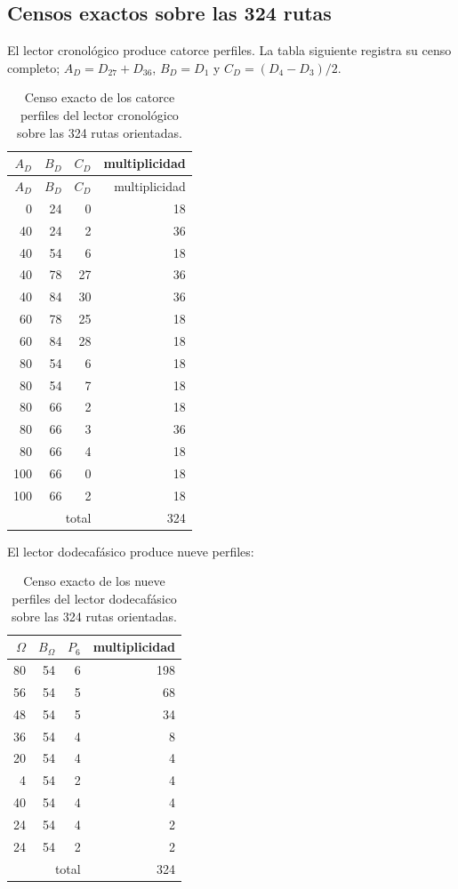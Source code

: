 \subsection{Censos exactos sobre las 324 rutas}

El lector cronológico produce catorce perfiles. La tabla siguiente registra su
censo completo; \(A_D=D_{27}+D_{36}\), \(B_D=D_1\) y
\(C_D=(D_4-D_3)/2\).

\begin{longtable}{@{}rrr r@{}}
\caption{Censo exacto de los catorce perfiles del lector cronológico sobre las
324 rutas orientadas.}
\label{tab:censo-perfiles-kd-rev11}\\
\toprule
\(A_D\)&\(B_D\)&\(C_D\)&multiplicidad\\
\midrule
\endfirsthead
\toprule
\(A_D\)&\(B_D\)&\(C_D\)&multiplicidad\\
\midrule
\endhead
0&24&0&18\\
40&24&2&36\\
40&54&6&18\\
40&78&27&36\\
40&84&30&36\\
60&78&25&18\\
60&84&28&18\\
80&54&6&18\\
80&54&7&18\\
80&66&2&18\\
80&66&3&36\\
80&66&4&18\\
100&66&0&18\\
100&66&2&18\\
\midrule
\multicolumn{3}{r}{total}&324\\
\bottomrule
\end{longtable}

El lector dodecafásico produce nueve perfiles:

\begin{table}[H]
\centering
\caption{Censo exacto de los nueve perfiles del lector dodecafásico sobre
las 324 rutas orientadas.}
\label{tab:censo-perfiles-komega-rev11}
\begin{tabular}{@{}rrr r@{}}
\toprule
\(\Omega\)&\(B_\Omega\)&\(P_6\)&multiplicidad\\
\midrule
80&54&6&198\\
56&54&5&68\\
48&54&5&34\\
36&54&4&8\\
20&54&4&4\\
4&54&2&4\\
40&54&4&4\\
24&54&4&2\\
24&54&2&2\\
\midrule
\multicolumn{3}{r}{total}&324\\
\bottomrule
\end{tabular}
\end{table}

